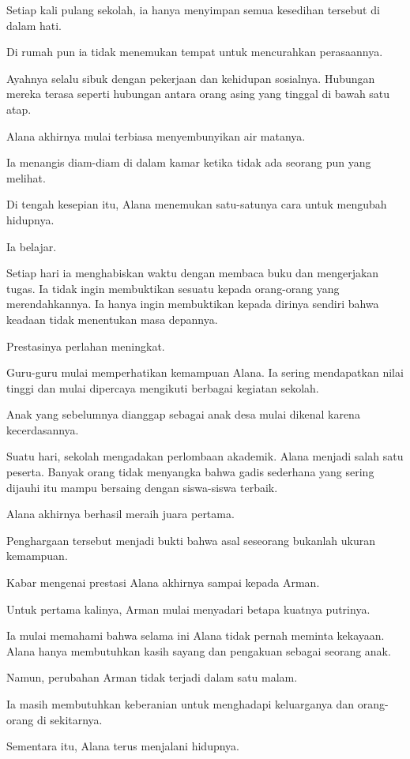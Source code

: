 Setiap kali pulang sekolah, ia hanya menyimpan semua kesedihan tersebut di dalam hati.

Di rumah pun ia tidak menemukan tempat untuk mencurahkan perasaannya.

Ayahnya selalu sibuk dengan pekerjaan dan kehidupan sosialnya. Hubungan mereka terasa seperti hubungan antara orang asing yang tinggal di bawah satu atap.

Alana akhirnya mulai terbiasa menyembunyikan air matanya.

Ia menangis diam-diam di dalam kamar ketika tidak ada seorang pun yang melihat.

Di tengah kesepian itu, Alana menemukan satu-satunya cara untuk mengubah hidupnya.

Ia belajar.

Setiap hari ia menghabiskan waktu dengan membaca buku dan mengerjakan tugas. Ia tidak ingin membuktikan sesuatu kepada orang-orang yang merendahkannya. Ia hanya ingin membuktikan kepada dirinya sendiri bahwa keadaan tidak menentukan masa depannya.

Prestasinya perlahan meningkat.

Guru-guru mulai memperhatikan kemampuan Alana. Ia sering mendapatkan nilai tinggi dan mulai dipercaya mengikuti berbagai kegiatan sekolah.

Anak yang sebelumnya dianggap sebagai anak desa mulai dikenal karena kecerdasannya.

Suatu hari, sekolah mengadakan perlombaan akademik. Alana menjadi salah satu peserta. Banyak orang tidak menyangka bahwa gadis sederhana yang sering dijauhi itu mampu bersaing dengan siswa-siswa terbaik.

Alana akhirnya berhasil meraih juara pertama.

Penghargaan tersebut menjadi bukti bahwa asal seseorang bukanlah ukuran kemampuan.

Kabar mengenai prestasi Alana akhirnya sampai kepada Arman.

Untuk pertama kalinya, Arman mulai menyadari betapa kuatnya putrinya.

Ia mulai memahami bahwa selama ini Alana tidak pernah meminta kekayaan. Alana hanya membutuhkan kasih sayang dan pengakuan sebagai seorang anak.

Namun, perubahan Arman tidak terjadi dalam satu malam.

Ia masih membutuhkan keberanian untuk menghadapi keluarganya dan orang-orang di sekitarnya.

Sementara itu, Alana terus menjalani hidupnya.

